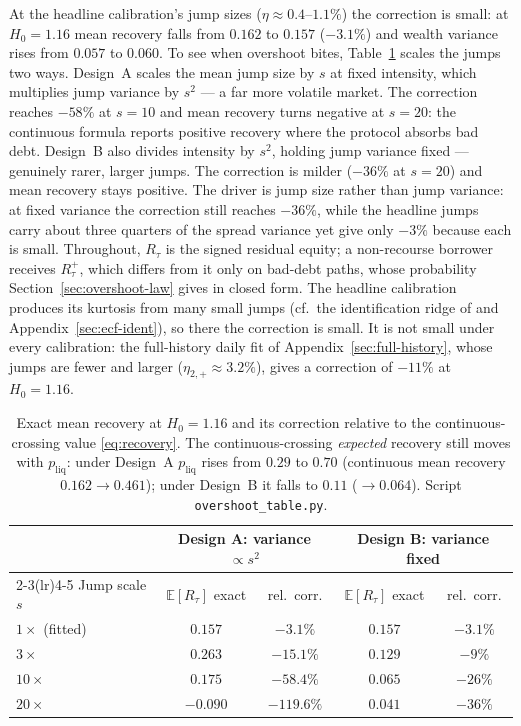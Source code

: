 \documentclass[11pt]{article}
\newcommand{\E}{\mathbb{E}}
\theoremstyle{plain}
\theoremstyle{definition}
\theoremstyle{remark}
\begin{document}
At the headline calibration's jump sizes ($\eta\approx0.4$--$1.1\%$) the correction is small: at $H_0=1.16$ mean
recovery falls from $0.162$ to $0.157$ ($-3.1\%$) and wealth variance rises from $0.057$ to $0.060$.
To see when overshoot bites, Table~\ref{tab:overshoot} scales the jumps two ways. Design~A scales
the mean jump size by $s$ at fixed intensity, which multiplies jump variance by $s^2$ --- a far more
volatile market. The correction reaches $-58\%$ at $s=10$ and mean recovery turns negative at
$s=20$: the continuous formula reports positive recovery where the protocol absorbs bad debt. Design~B
also divides intensity by $s^2$, holding jump variance fixed --- genuinely rarer, larger jumps. The
correction is milder ($-36\%$ at $s=20$) and mean recovery stays positive. The driver is jump size
rather than jump variance: at fixed variance the correction still reaches $-36\%$, while the headline
jumps carry about three quarters of the spread variance yet give only $-3\%$ because each is small.
Throughout, $R_\tau$ is the signed residual equity; a non-recourse borrower receives $R_\tau^+$,
which differs from it only on bad-debt paths, whose probability Section~\ref{sec:overshoot-law}
gives in closed form. The headline
calibration produces its kurtosis from many small jumps (cf.\ the identification ridge of
\citealt{RamezaniZeng2007} and Appendix~\ref{sec:ecf-ident}), so there the correction is small. It is
not small under every calibration: the full-history daily fit of Appendix~\ref{sec:full-history},
whose jumps are fewer and larger ($\eta_{2,+}\approx3.2\%$), gives a correction of $-11\%$ at
$H_0=1.16$.

\begin{table}[ht]
\centering
\small
\begin{tabular}{lcccc}
\toprule
 & \multicolumn{2}{c}{Design A: variance $\propto s^2$} & \multicolumn{2}{c}{Design B: variance fixed} \\
\cmidrule(lr){2-3}\cmidrule(lr){4-5}
Jump scale $s$ & $\E[R_\tau]$ exact & rel.\ corr. & $\E[R_\tau]$ exact & rel.\ corr. \\
\midrule
$1\times$ (fitted)  & $0.157$ & $-3.1\%$  & $0.157$ & $-3.1\%$ \\
$3\times$           & $0.263$ & $-15.1\%$ & $0.129$ & $-9\%$ \\
$10\times$          & $0.175$ & $-58.4\%$ & $0.065$ & $-26\%$ \\
$20\times$          & $-0.090$ & $-119.6\%$ & $0.041$ & $-36\%$ \\
\bottomrule
\end{tabular}
\caption{Exact mean recovery at $H_0=1.16$ and its correction relative to the continuous-crossing
value \eqref{eq:recovery}. The continuous-crossing \emph{expected} recovery still moves with
$p_{\mathrm{liq}}$: under Design~A $p_{\mathrm{liq}}$ rises from $0.29$ to $0.70$ (continuous mean
recovery $0.162\to0.461$); under Design~B it falls to $0.11$ ($\to0.064$). Script
\texttt{overshoot\_table.py}.}
\label{tab:overshoot}
\end{table}
\end{document}
